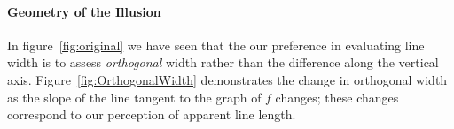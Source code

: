 \documentclass[12pt]{article}\usepackage[]{graphicx}\usepackage[]{color}
\begin{document}
\paragraph{Geometry of the Illusion}\hfill\newline
In figure~\ref{fig:original} we have seen that the our preference in evaluating line width is to assess {\it orthogonal} width rather than the difference along the vertical axis. 
Figure~\ref{fig:OrthogonalWidth} demonstrates the change in orthogonal width as the slope of the line tangent to the graph of $f$ changes; these changes correspond to our perception of apparent line length. 
\end{document}
